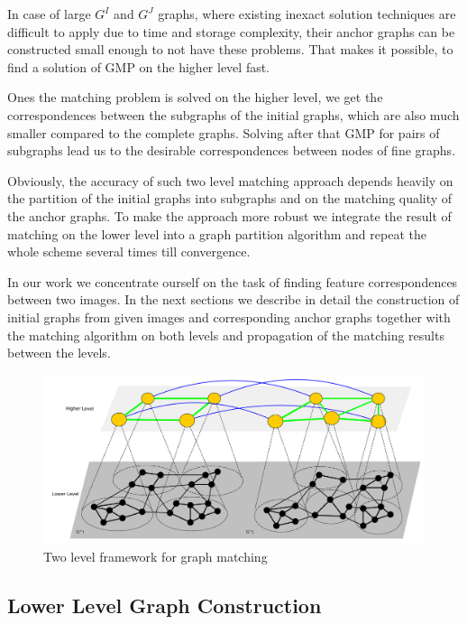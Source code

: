 In case of large $G^I$ and $G^J$ graphs, where existing inexact solution techniques are difficult to apply due to time and storage complexity, their anchor graphs can be constructed small enough to not have these problems. That makes it possible, to find a solution of GMP on the higher level fast. 

Ones the matching problem is solved on the higher level, we get the correspondences between the subgraphs of the initial graphs, which are also much smaller compared to the complete graphs. Solving after that GMP for pairs of subgraphs lead us to the desirable correspondences between nodes of fine graphs.

Obviously, the accuracy of such two level matching approach depends heavily on the partition of the initial graphs into subgraphs and on the matching quality of the anchor graphs. To make the approach more robust we integrate the result of matching on the lower level into a graph partition algorithm and repeat the whole scheme several times till convergence.

In our work we concentrate ourself on the task of finding feature correspondences between two images. In the next sections we describe in detail the construction of initial graphs from given images and corresponding anchor graphs together with the matching algorithm on both levels and propagation of the matching results between the levels.

\begin{figure}
	\centering
	\includegraphics[scale=0.35]{chapter2/fig/twolevels.pdf}
	\caption{Two level framework for graph matching} \label{fig:2levels}
\end{figure}

\FloatBarrier

\subsection{Lower Level Graph Construction}

